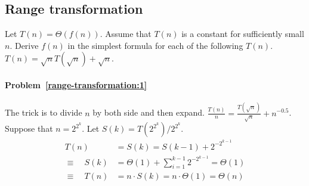 \subsection{Range transformation}
\begin{Exercise}[origin={NCTU CSIE 93}]
Let $T(n) = \Theta(f(n))$. Assume that $T(n)$ is a constant for sufficiently small $n$. Derive $f(n)$ in the simplest formula for each of the following $T(n)$.
\Question $T(n) = \sqrt{n} T(\sqrt{n}) + \sqrt{n}$. \label{range-transformation:1}
\end{Exercise}
\begin{Answer}
\paragraph{Problem~\ref{range-transformation:1}}
The trick is to divide $n$ by both side and then expand.
$\frac{T(n)}{n} =  \frac{T(\sqrt{n})}{\sqrt{n}} + n^{-0.5}$.
Suppose that $n = 2^{2^k}$. Let $S(k) = T(2^{2^k})/2^{2^k}$. 
\begin{align*}
T(n) & = S(k) = S(k-1) + 2^{-2^{k-1}} \\
\equiv \quad S(k) &= \Theta(1) + \sum_{i=1}^{k-1} 2^{-2^{k-1}} = \Theta(1) \\
\equiv \quad T(n) &= n \cdot S(k) = n \cdot \Theta(1) = \Theta(n) \\
\end{align*}
\end{Answer}

